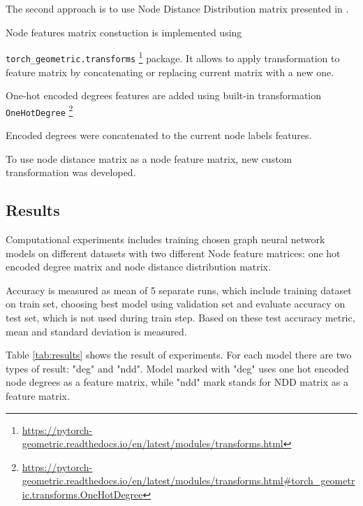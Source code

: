 
The second approach is to use Node Distance Distribution matrix presented in \cite{Netpro2vec}.





Node features matrix constuction is implemented using

\texttt{torch\_geometric.transforms} \footnote{\url{https://pytorch-geometric.readthedocs.io/en/latest/modules/transforms.html}}
package. It allows to apply transformation to feature matrix by concatenating or replacing current matrix with a new one.

One-hot encoded degrees features are added using built-in transformation \texttt{OneHotDegree}
\footnote{\url{https://pytorch-geometric.readthedocs.io/en/latest/modules/transforms.html\#torch_geometric.transforms.OneHotDegree}}

Encoded degrees were concatenated to the current node labels features.

To use node distance matrix as a node feature matrix, new custom transformation was developed.






\subsection{Results}

Computational experiments includes training chosen graph neural network models on different datasets with two different
Node feature matrices: one hot encoded degree matrix and node distance distribution matrix.

Accuracy is measured as mean of 5 separate runs, which include training dataset on train set, choosing
best model using validation set and evaluate accuracy on test set, which is not used during train step.
Based on these test accuracy metric, mean and standard deviation is measured.

Table \ref{tab:results} shows the result of experiments. For each model there are two types of result: "deg" and "ndd".
Model marked with "deg" uses one hot encoded node degrees as a feature matrix, while "ndd" mark stands for NDD matrix 
as a feature matrix.

